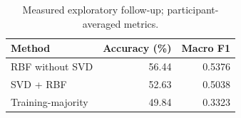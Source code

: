 \begin{table}[ht]
\centering
\caption{Measured exploratory follow-up; participant-averaged metrics.}
\begin{tabular}{lrr}\hline Method & Accuracy (\%) & Macro F1 \\ \hline
RBF without SVD & 56.44 & 0.5376 \\
SVD + RBF & 52.63 & 0.5038 \\
Training-majority & 49.84 & 0.3323 \\
\hline\end{tabular}
\end{table}
